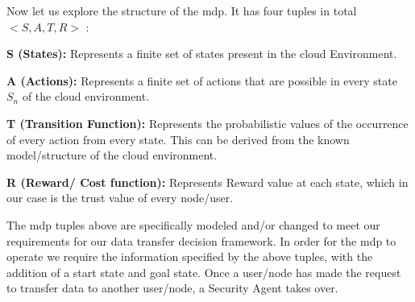 Now let us explore the structure of the \gls{mdp}. It
has four tuples in total $< S, A, T, R >$ \autocite{QimingHe2000}:
\begin{description}
    \item{\textbf{S (States):}} Represents a finite set of states present in the cloud Environment.
    \item{\textbf{A (Actions):}} Represents a finite set of actions that are possible in
        every state $S_n$ of the cloud environment.
    \item{\textbf{T (Transition Function):}} Represents the probabilistic values of the occurrence of every action from every state. This can be derived from the known model/structure of the cloud environment.
    \item{\textbf{R (Reward/ Cost function):}} Represents Reward value at each state, which
    in our case is the trust value of every node/user.  
\end{description}
The \gls{mdp} tuples above are
specifically modeled and/or changed to meet our requirements for our data
transfer decision framework. In order for the \gls{mdp} to operate we require the
information specified by the above tuples, with the addition of a start
state and goal state. Once a user/node has made the request to transfer data
to another user/node, a Security Agent takes over. 

